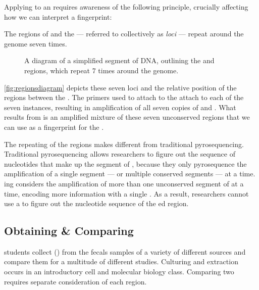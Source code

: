 Applying \pcr{} to an \ecoli{} \isol{} requires awareness of the following principle, crucially affecting how we can interpret a fingerprint:

\begin{principle}
The \itsshort{} regions of \ecoli{} and the \rrna{} --- referred to collectively as \textit{loci} --- repeat around the \ecoli{} genome seven times.
\end{principle}

\begin{figure}
    \centering
    
    \caption{A diagram of a simplified segment of \ecoli{} DNA, outlining the \Ssixt{} and \Sfive{} \itsshort{} regions, which repeat 7 times around the \ecoli{} genome.}
    \label{fig:regionsdiagram}
\end{figure}
\autoref{fig:regionsdiagram} depicts these seven loci and the relative position of the \itsshort{} regions between the \rrna{}.
The primers used to attach to the \rrna{} attach to each of the seven instances, resulting in \pcr{} amplification of all seven copies of \Ssixt{} and \Sfive{}.
What results from \pcr{} is an amplified mixture of these seven unconserved \itsshort{} regions that we can use as a fingerprint for the \isol{}.


The repeating of the \itsshort{} regions makes \pyros{} different from traditional pyrosequencing.
Traditional pyrosequencing allows researchers to figure out the sequence of nucleotides that make up the segment of \dna{}, because they only pyrosequence the \pcr{} amplification of a single segment --- or multiple conserved segments --- at a time.
\Pyro{}ing considers the \pcr{} amplification of more than one unconserved segment of \dna{} at a time, encoding more information with a single \pyro{}.
As a result, \cplop{} researchers cannot use a \pyro{} to figure out the nucleotide sequence of the \pyro{}ed \itsshort{} region.

\subsection{Obtaining \& Comparing \ecolilong{} \Isols{}}
\cp{} students collect \ecolilong{} (\ecoli{}) \isols{} from the fecals samples of a variety of different sources and compare them for a multitude of different studies.
Culturing and \ecoli{} extraction occurs in an introductory cell and molecular biology class.
Comparing two \isols{} requires separate consideration of each \itsshort{} region.


